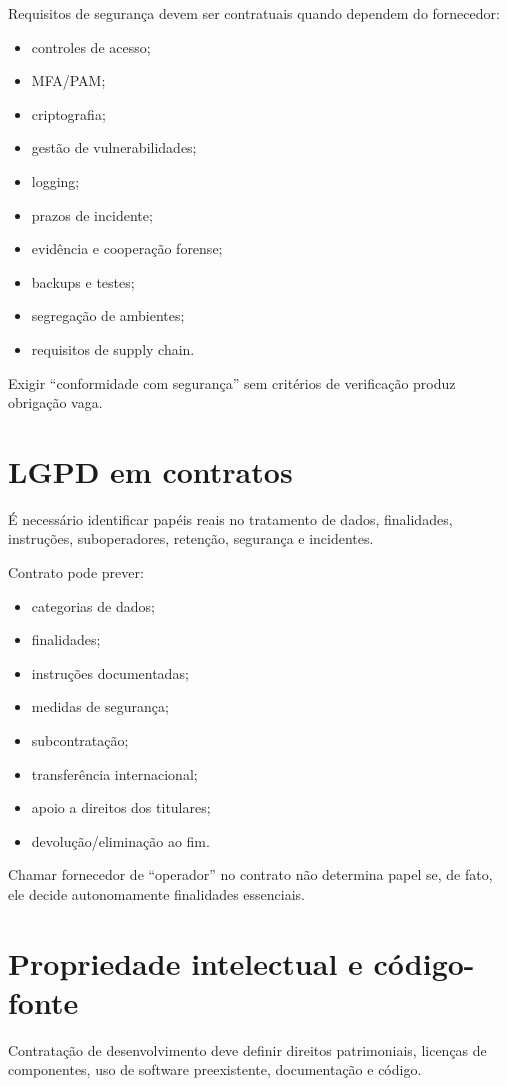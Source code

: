 Requisitos de segurança devem ser contratuais quando dependem do fornecedor:
\begin{itemize}
\item controles de acesso;
\item MFA/PAM;
\item criptografia;
\item gestão de vulnerabilidades;
\item logging;
\item prazos de incidente;
\item evidência e cooperação forense;
\item backups e testes;
\item segregação de ambientes;
\item requisitos de supply chain.
\end{itemize}

Exigir ``conformidade com segurança'' sem critérios de verificação produz obrigação vaga.

\section{LGPD em contratos}

É necessário identificar papéis reais no tratamento de dados, finalidades, instruções, suboperadores, retenção, segurança e incidentes.

Contrato pode prever:
\begin{itemize}
\item categorias de dados;
\item finalidades;
\item instruções documentadas;
\item medidas de segurança;
\item subcontratação;
\item transferência internacional;
\item apoio a direitos dos titulares;
\item devolução/eliminação ao fim.
\end{itemize}

Chamar fornecedor de ``operador'' no contrato não determina papel se, de fato, ele decide autonomamente finalidades essenciais.

\section{Propriedade intelectual e código-fonte}

Contratação de desenvolvimento deve definir direitos patrimoniais, licenças de componentes, uso de software preexistente, documentação e código.

